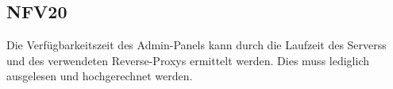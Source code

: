 \subsection*{NFV20}

Die Verfügbarkeitszeit des \Gls{Admin-Panel}s kann durch die Laufzeit des \Glspl{Server}s und des verwendeten \Gls{Reverse-Proxy}s ermittelt werden.
Dies muss lediglich ausgelesen und hochgerechnet werden.